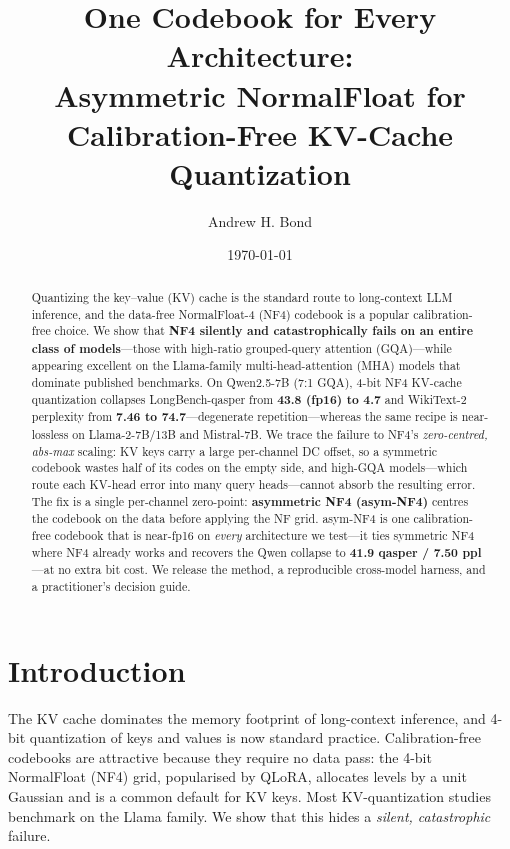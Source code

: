 \documentclass[11pt]{article}
\title{\textbf{One Codebook for Every Architecture:\\ Asymmetric NormalFloat for Calibration-Free KV-Cache Quantization}}
\author{Andrew H. Bond}
\date{\today}
\begin{document}
\maketitle

\begin{abstract}
Quantizing the key--value (KV) cache is the standard route to long-context LLM inference,
and the data-free NormalFloat-4 (NF4) codebook is a popular calibration-free choice. We show
that \textbf{NF4 silently and catastrophically fails on an entire class of models}---those
with high-ratio grouped-query attention (GQA)---while appearing excellent on the Llama-family
multi-head-attention (MHA) models that dominate published benchmarks. On Qwen2.5-7B (7:1 GQA),
4-bit NF4 KV-cache quantization collapses LongBench-qasper from \textbf{43.8 (fp16) to 4.7} and
WikiText-2 perplexity from \textbf{7.46 to 74.7}---degenerate repetition---whereas the same
recipe is near-lossless on Llama-2-7B/13B and Mistral-7B. We trace the failure to NF4's
\emph{zero-centred, abs-max} scaling: KV keys carry a large per-channel DC offset, so a
symmetric codebook wastes half of its codes on the empty side, and high-GQA models---which
route each KV-head error into many query heads---cannot absorb the resulting error. The fix is
a single per-channel zero-point: \textbf{asymmetric NF4 (asym-NF4)} centres the codebook on the
data before applying the NF grid. asym-NF4 is one calibration-free codebook that is near-fp16
on \emph{every} architecture we test---it ties symmetric NF4 where NF4 already works and
recovers the Qwen collapse to \textbf{41.9 qasper / 7.50 ppl}---at no extra bit cost. We release
the method, a reproducible cross-model harness, and a practitioner's decision guide.
\end{abstract}

\section{Introduction}
The KV cache dominates the memory footprint of long-context inference, and 4-bit quantization
of keys and values is now standard practice. Calibration-free codebooks are attractive because
they require no data pass: the 4-bit NormalFloat (NF4) grid, popularised by QLoRA, allocates
levels by a unit Gaussian and is a common default for KV keys. Most KV-quantization studies
benchmark on the Llama family. We show that this hides a \emph{silent, catastrophic} failure.
\end{document}
